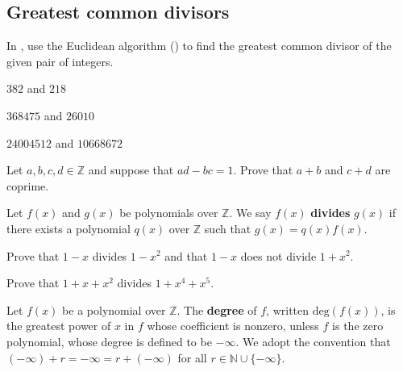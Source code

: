 \subsection*{Greatest common divisors}

In , use the Euclidean algorithm () to find the greatest common divisor of the given pair of integers.

\begin{chapex}
\label{cqEuclideanAlgorithmBegin}
$382$ and $218$
\end{chapex}

\begin{chapex}
$368475$ and $26010$
\end{chapex}

\begin{chapex}
\label{cqEuclideanAlgorithmEnd}
$24004512$ and $10668672$
\end{chapex}

\begin{chapex}
\label{cqSumsOfIntegersAreCoprime}
Let $a,b,c,d \in \mathbb{Z}$ and suppose that $ad-bc = 1$. Prove that $a+b$ and $c+d$ are coprime.
\end{chapex}

\begin{definition}
Let $f(x)$ and $g(x)$ be polynomials over $\mathbb{Z}$. We say $f(x)$ \textbf{divides} $g(x)$ if there exists a polynomial $q(x)$ over $\mathbb{Z}$ such that $g(x) = q(x)f(x)$.
\end{definition}

\begin{chapex}
Prove that $1-x$ divides $1-x^2$ and that $1-x$ does not divide $1+x^2$.
\end{chapex}

\begin{chapex}
Prove that $1+x+x^2$ divides $1+x^4+x^5$.
\end{chapex}

\begin{definition}
Let $f(x)$ be a polynomial over $\mathbb{Z}$. The \textbf{degree} of $f$, written $\mathrm{deg}(f(x))$, is the greatest power of $x$ in $f$ whose coefficient is nonzero, unless $f$ is the zero polynomial, whose degree is defined to be $-\infty$. We adopt the convention that $(-\infty) + r = -\infty = r + (-\infty)$ for all $r \in \mathbb{N} \cup \{ -\infty \}$.
\end{definition}

